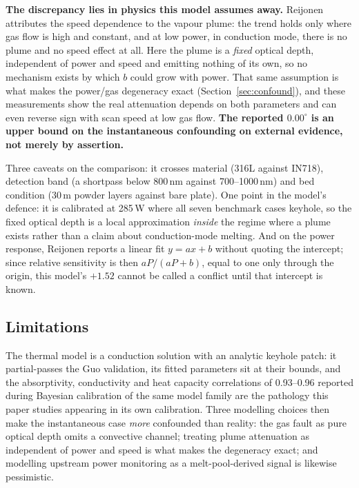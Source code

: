 \documentclass[preprint,times]{elsarticle}
\begin{document}
\textbf{The discrepancy lies in physics this model assumes away.} Reijonen
attributes the speed dependence to the vapour plume: the trend holds only where
gas flow is high and constant, and at low power, in conduction mode, there is no
plume and no speed effect at all. Here the plume is a \emph{fixed} optical depth,
independent of power and speed and emitting nothing of its own, so no mechanism
exists by which $b$ could grow with power. That same assumption is what makes
the power/gas degeneracy exact (Section~\ref{sec:confound}), and these
measurements show the real attenuation depends on both parameters and can even
reverse sign with scan speed at low gas flow. \textbf{The reported $0.00^\circ$
is an upper bound on the instantaneous confounding on external evidence, not
merely by assertion.}

Three caveats on the comparison: it crosses material (316L against IN718),
detection band (a shortpass below 800\,nm against 700--1000\,nm) and bed
condition (30\,\textmu m powder layers against bare plate). One point in the
model's defence: it is calibrated at 285\,W where all seven benchmark cases
keyhole, so the fixed optical depth is a local approximation \emph{inside} the
regime where a plume exists rather than a claim about conduction-mode melting.
And on the power response, Reijonen reports a linear fit $y=ax+b$ without
quoting the intercept; since relative sensitivity is then $aP/(aP+b)$, equal to
one only through the origin, this model's $+1.52$ cannot be called a conflict
until that intercept is known.

\subsection{Limitations}
\label{sec:limits}

The thermal model is a conduction solution with an analytic keyhole patch: it
partial-passes the Guo validation, its fitted parameters sit at their bounds, and
the absorptivity, conductivity and heat capacity correlations of 0.93--0.96
reported during Bayesian calibration of the same model family \cite{Hon2021} are
the pathology this paper studies appearing in its own calibration. Three
modelling choices then make the instantaneous case \emph{more} confounded than
reality: the gas fault as pure optical depth omits a convective channel; treating
plume attenuation as independent of power and speed is what makes the degeneracy
exact; and modelling upstream power monitoring as a melt-pool-derived signal is
likewise pessimistic.
\end{document}
